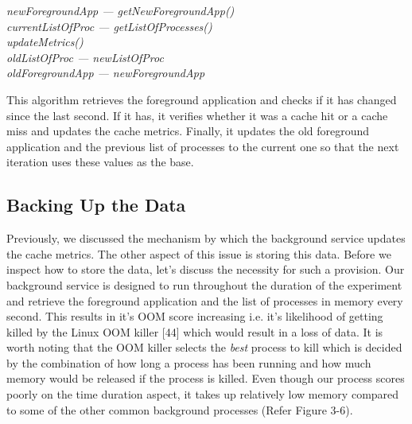 \documentclass[12pt]{uthesis-v12}  %
\begin{document}
		 	\begin{algorithm}[H]
		 		\SetAlgoLined
		 				 		
		 		{	
		 			{\em newForegroundApp --- getNewForegroundApp()}\\
		 			{\em currentListOfProc --- getListOfProcesses()}\\	 			
		 			{\em updateMetrics()}\\
		 			{\em oldListOfProc --- newListOfProc}\\
		 			{\em oldForegroundApp --- newForegroundApp}		 			
		 		}
		 		
		 		\caption[Algorithm to update cache metrics]{This algorithm retrieves the foreground application and checks if it has changed since the last second. If it has, it verifies whether it was a cache hit or a cache miss and updates the cache metrics. Finally, it updates the old foreground application and the previous list of processes to the current one so that the next iteration uses these values as the base.}
		 	\end{algorithm}

		\subsection{Backing Up the Data}
			Previously, we discussed the mechanism by which the background service updates the cache metrics. The other aspect of this issue is storing this data. Before we inspect how to store the data, let's discuss the necessity for such a provision. Our background service is designed to run throughout the duration of the experiment and retrieve the foreground application and the list of processes in memory every second. This results in it's OOM score increasing i.e. it's likelihood of getting killed by the Linux OOM killer [44] which would result in a loss of data. It is worth noting that the OOM killer selects the {\em best} process to kill which is decided by the combination of how long a process has been running and how much memory would be released if the process is killed. Even though our process scores poorly on the time duration aspect, it takes up relatively low memory compared to some of the other common background processes (Refer Figure 3-6).
\end{document}
